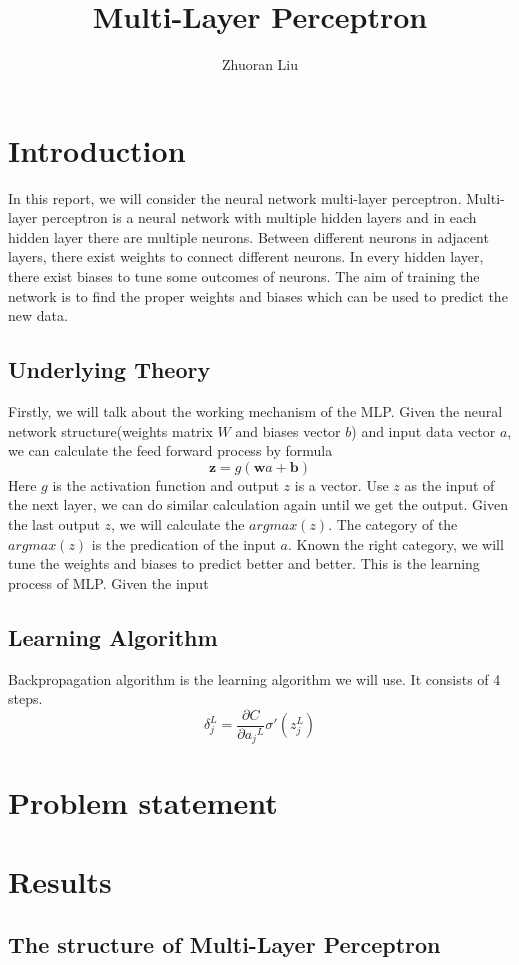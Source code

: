 \documentclass[12pt,a4paper]{article}
\author{Zhuoran Liu}
\title{Multi-Layer Perceptron}
\begin{document}
\maketitle

\color{black}
\newpage
\section{Introduction}
In this report, we will consider the neural network multi-layer perceptron. Multi-layer perceptron is a neural network with multiple hidden layers and in each hidden layer there are multiple neurons. Between different neurons in adjacent layers, there exist weights to connect different neurons. In every hidden layer, there exist biases to tune some outcomes of neurons. The aim of training the network is to find the proper weights and biases which can be used to predict the new data.
\subsection{Underlying Theory}
Firstly, we will talk about the working mechanism of the MLP. Given the neural network structure(weights matrix $W$ and biases vector $b$) and input data vector $a$, we can calculate the feed forward process by formula
\[\textbf{z} = g(\textbf{w}a + \textbf{b})\]
Here $g$ is the activation function and output $z$ is a vector. Use $z$ as the input of the next layer, we can do similar calculation again until we get the output. Given the last output $z$, we will calculate the $argmax(z)$. The category of the $argmax(z)$ is the predication of the input $a$. Known the right category, we will tune the weights and biases to predict better and better. This is the learning process of MLP. 
Given the input 
\subsection{Learning Algorithm}
Backpropagation algorithm is the learning algorithm we will use. It consists of 4 steps.
\[\delta_{j}^{L} = \frac{\partial C}{\partial{a_{j}}^{L}} \sigma'(z_{j}^{L})\]
\newpage
\section{Problem statement}

\section{Results}
\subsection{The structure of Multi-Layer Perceptron}
\end{document}

